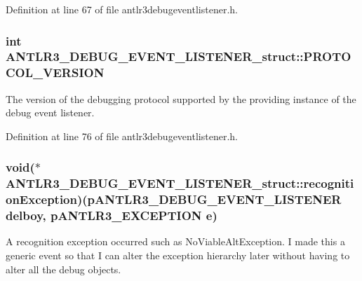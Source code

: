 Definition at line 67 of file antlr3debugeventlistener.\-h.

\hypertarget{struct_a_n_t_l_r3___d_e_b_u_g___e_v_e_n_t___l_i_s_t_e_n_e_r__struct_af15ca775d7e1dcb484542fdc30ed63a1}{
\subsubsection[{P\-R\-O\-T\-O\-C\-O\-L\-\_\-\-V\-E\-R\-S\-I\-O\-N}]{\setlength{\rightskip}{0pt plus 5cm}int A\-N\-T\-L\-R3\-\_\-\-D\-E\-B\-U\-G\-\_\-\-E\-V\-E\-N\-T\-\_\-\-L\-I\-S\-T\-E\-N\-E\-R\-\_\-struct\-::\-P\-R\-O\-T\-O\-C\-O\-L\-\_\-\-V\-E\-R\-S\-I\-O\-N}}\label{struct_a_n_t_l_r3___d_e_b_u_g___e_v_e_n_t___l_i_s_t_e_n_e_r__struct_af15ca775d7e1dcb484542fdc30ed63a1}
The version of the debugging protocol supported by the providing instance of the debug event listener. 

Definition at line 76 of file antlr3debugeventlistener.\-h.

\hypertarget{struct_a_n_t_l_r3___d_e_b_u_g___e_v_e_n_t___l_i_s_t_e_n_e_r__struct_a71f7ad3f972749e585973773a7cfb69d}{
\subsubsection[{recognition\-Exception}]{\setlength{\rightskip}{0pt plus 5cm}void($\ast$ A\-N\-T\-L\-R3\-\_\-\-D\-E\-B\-U\-G\-\_\-\-E\-V\-E\-N\-T\-\_\-\-L\-I\-S\-T\-E\-N\-E\-R\-\_\-struct\-::recognition\-Exception)({\bf p\-A\-N\-T\-L\-R3\-\_\-\-D\-E\-B\-U\-G\-\_\-\-E\-V\-E\-N\-T\-\_\-\-L\-I\-S\-T\-E\-N\-E\-R} delboy, {\bf p\-A\-N\-T\-L\-R3\-\_\-\-E\-X\-C\-E\-P\-T\-I\-O\-N} e)}}\label{struct_a_n_t_l_r3___d_e_b_u_g___e_v_e_n_t___l_i_s_t_e_n_e_r__struct_a71f7ad3f972749e585973773a7cfb69d}
A recognition exception occurred such as No\-Viable\-Alt\-Exception. I made this a generic event so that I can alter the exception hierarchy later without having to alter all the debug objects.

